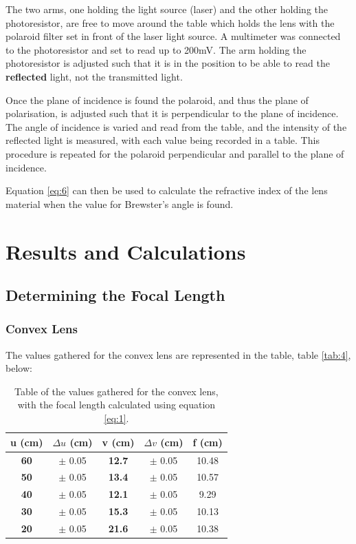 \documentclass[12pt]{article}
\begin{document}
The two arms, one holding the light source (laser) and the other holding the photoresistor, are free to move around the table which holds the lens with the polaroid filter set in front of the laser light source.
A multimeter was connected to the photoresistor and set to read up to 200mV. The arm holding the photoresistor is adjusted such that it is in the position to be able to read the \textbf{reflected} 
light, not the transmitted light.

Once the plane of incidence is found the polaroid, and thus the plane of polarisation, is adjusted such that it is perpendicular to the plane of incidence.
The angle of incidence is varied and read from the table, and the intensity of the reflected light is measured, with each value being recorded in a table.
This procedure is repeated for the polaroid perpendicular and parallel to the plane of incidence.

Equation \ref{eq:6} can then be used to calculate the refractive index of the lens material when the value for Brewster's angle is found.

\section{Results and Calculations} \label{sec:3}

\subsection{Determining the Focal Length} \label{sec:3.1}

\subsubsection{Convex Lens} \label{sec:3.1.1}

The values gathered for the convex lens are represented in the table, table \ref{tab:4}, below:

\begin{table}[H]
    \centering

    \begin{tabular}{|c|c|c|c|c|}
    \hline
    \textbf{u (cm)} & $\Delta u$ (cm) & \textbf{v (cm)} & $\Delta v$ (cm) & f (cm) \\ \hline
    \textbf{60}     & $\pm$ 0.05      & \textbf{12.7}   & $\pm$ 0.05      & 10.48  \\ \hline
    \textbf{50}     & $\pm$ 0.05      & \textbf{13.4}   & $\pm$ 0.05      & 10.57  \\ \hline
    \textbf{40}     & $\pm$ 0.05      & \textbf{12.1}   & $\pm$ 0.05      & 9.29   \\ \hline
    \textbf{30}     & $\pm$ 0.05      & \textbf{15.3}   & $\pm$ 0.05      & 10.13  \\ \hline
    \textbf{20}     & $\pm$ 0.05      & \textbf{21.6}   & $\pm$ 0.05      & 10.38  \\ \hline
    \end{tabular}

    \caption{\centering Table of the values gathered for the convex lens, with the focal length calculated using equation \ref{eq:1}.}
    \label{tab:3}
\end{table}
\end{document}
